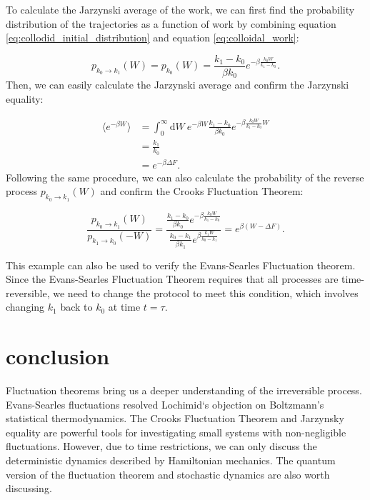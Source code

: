 \documentclass[ reprint, amsmath,amssymb, aps,]{revtex4-1}
\begin{document}
To calculate the Jarzynski average of the work, we can first find the probability distribution of the trajectories as a function of work by combining equation \ref{eq:collodid_initial_distribution} and equation \ref{eq:colloidal_work}:

\begin{equation}
p_{k_0\to k_1}(W)=p_{k_0}(W)=\frac{k_1-k_0}{\beta k_0}e^{-\beta\frac{k_0W}{k_1-k_0}}.
\end{equation}
Then, we can easily calculate the Jarzynski average and confirm the Jarzynski equality: 

\begin{equation}
\begin{split}
\langle e^{-\beta W}\rangle
&=\int_0^\infty \mathrm{d}W\ e^{-\beta W}\frac{k_1-k_0}{\beta k_0}e^{-\beta\frac{k_0W}{k_1-k_0}W}\\
&=\frac{k_1}{k_0}\\
&=e^{-\beta \Delta F}.
\end{split}
\end{equation}
Following the same procedure, we can also calculate the probability of the reverse process $p_{k_0\to k_1}(W)$ and confirm the Crooks Fluctuation Theorem: 

\begin{equation}
\frac{p_{k_0\to k_1}(W)}{p_{k_1\to k_0}(-W)}=\frac{\frac{k_1-k_0}{\beta k_0}e^{-\beta\frac{k_0W}{k_1-k_0}}}{\frac{k_0-k_1}{\beta k_1}e^{\beta\frac{k_1W}{k_0-k_1}}}=e^{\beta(W-\Delta F)}.
\end{equation}

This example can also be used to verify the Evans-Searles Fluctuation theorem. Since the Evans-Searles Fluctuation Theorem requires that all processes are time-reversible, we need to change the protocol to meet this condition, which involves changing $k_1$ back to $k_0$ at time $t=\tau$.

\section{conclusion}

Fluctuation theorems bring us a deeper understanding of the irreversible process. Evans-Searles fluctuations resolved Lochimid‘s objection on Boltzmann's statistical thermodynamics. The Crooks Fluctuation Theorem and Jarzynsky equality are powerful tools for investigating small systems with non-negligible fluctuations. However, due to time restrictions, we can only discuss the deterministic dynamics described by Hamiltonian mechanics. The quantum version of the fluctuation theorem and stochastic dynamics are also worth discussing. 
\end{document}
